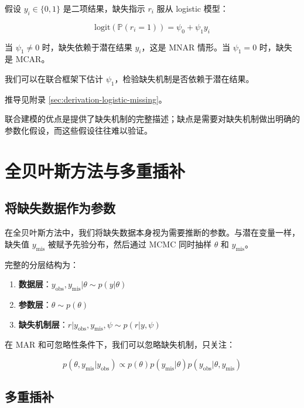 \begin{Example}[二元数据的缺失机制]\label{ex:binary-missing-mechanism}
  假设 $y_i \in \{0, 1\}$ 是二项结果，缺失指示 $r_i$ 服从 logistic 模型：

  \[
  \mathrm{logit}(\mathbb{P}(r_i = 1)) = \psi_0 + \psi_1 y_i
  \label{eq:logistic-missing-model}
  \]

  当 $\psi_1 \neq 0$ 时，缺失依赖于潜在结果 $y_i$，这是 MNAR 情形。当 $\psi_1 = 0$ 时，缺失是 MCAR。

  我们可以在联合框架下估计 $\psi_1$，检验缺失机制是否依赖于潜在结果。
\end{Example}
推导见附录 \cref{sec:derivation-logistic-missing}。

联合建模的优点是提供了缺失机制的完整描述；缺点是需要对缺失机制做出明确的参数化假设，而这些假设往往难以验证。

\section{全贝叶斯方法与多重插补}
\label{sec:full-bayes-multiple-imputation}

\subsection{将缺失数据作为参数}

在全贝叶斯方法中，我们将缺失数据本身视为需要推断的参数。与潜在变量一样，缺失值 $y_{\text{mis}}$ 被赋予先验分布，然后通过 MCMC 同时抽样 $\theta$ 和 $y_{\text{mis}}$。

完整的分层结构为：

\begin{enumerate}
  \item \textbf{数据层}：$y_{\text{obs}}, y_{\text{mis}} | \theta \sim p(y | \theta)$
  \item \textbf{参数层}：$\theta \sim p(\theta)$
  \item \textbf{缺失机制层}：$r | y_{\text{obs}}, y_{\text{mis}}, \psi \sim p(r | y, \psi)$
\end{enumerate}

在 MAR 和可忽略性条件下，我们可以忽略缺失机制，只关注：

\[
p(\theta, y_{\text{mis}} | y_{\text{obs}}) \propto p(\theta) p(y_{\text{mis}} | \theta) p(y_{\text{obs}} | \theta, y_{\text{mis}})
\label{eq:bayesian-missing-posterior}
\]

\subsection{多重插补}

